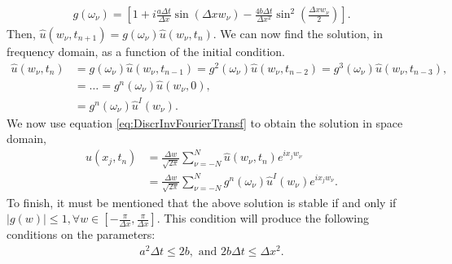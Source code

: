 \begin{questions}
\begin{solution}
\begin{align}
g(\omega_{\nu}) = \left[1+i\frac{a\Delta t}{ \Delta x}\sin\left(\Delta xw_{\nu}\right)-\frac{4b\Delta t}{\Delta x^2}\sin^2\left(\frac{\Delta xw_{\nu}}{2}\right)\right].
\end{align}
Then, $\hat{u}(w_{\nu}, t_{n+1}) = g(\omega_{\nu} )\hat{u}(w_{\nu}, t_n)$. We can now find the solution, in frequency domain, as a function of the initial condition.
\begin{align*}
\hat{u}(w_{\nu}, t_n) &= g(\omega_{\nu} )\hat{u}(w_{\nu}, t_{n-1})= g^2(\omega_{\nu} )\hat{u}(w_{\nu}, t_{n-2})= g^3(\omega_{\nu} )\hat{u}(w_{\nu}, t_{n-3}),\\
&= \dots = g^n(\omega_{\nu} )\hat{u}(w_{\nu}, 0),\\
&= g^n(\omega_{\nu} )\hat{u}^I(w_{\nu}).
\end{align*}
We now use equation \eqref{eq:DiscrInvFourierTransf} to obtain the solution in space domain,
\begin{align}
u(x_j,t_n)&=\frac{\Delta w}{\sqrt{2\pi}}\sum_{\nu=-N}^N \hat{u}(w_{\nu},t_n)e^{ix_jw_{\nu}}\nonumber\\
&= \frac{\Delta w}{\sqrt{2\pi}}\sum_{\nu=-N}^N g^n(\omega_{\nu} )\hat{u}^I(w_{\nu})e^{ix_jw_{\nu}}.
\end{align}
To finish, it must be mentioned that the above solution is stable if and only if $|g(w)|\leq 1, \forall w\in[-\frac{\pi}{\Delta x},\frac{\pi}{\Delta x}]$. This condition will produce the following conditions on the parameters:
\begin{align}\label{eq:CFL}
a^2\Delta t \leq 2b,\text{  and  }2b\Delta t\leq\Delta x^2.
\end{align}
\end{solution}
\end{questions}
